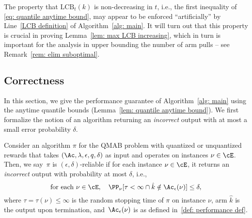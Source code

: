 \begin{remark}
\label{rem: LCB non decreasing}
    The property that $ \mathrm{LCB}_t(k)$ is non-decreasing 
    in $t$, i.e., the first inequality of \eqref{eq: quantile anytime bound}, may appear to be enforced ``artificially'' by Line~\ref{LCB definition} of Algorithm~\ref{alg: main}. 
    It will turn out that this property is crucial in proving Lemma~\ref{lem: max LCB increasing}, which 
    in turn is important for the analysis in upper bounding the number of arm pulls -- see Remark~\ref{rem: elim suboptimal}.
\end{remark}

\subsection{Correctness}
In this section, we give the performance guarantee of Algorithm~\ref{alg: main} using the anytime quantile bounds (Lemma~\ref{lem: quantile anytime bound}).
We first formalize the notion of an algorithm returning an \textit{incorrect} output with at most a small error probability $\delta$.

\begin{definition}
     Consider an algorithm $\pi$ for the QMAB problem with quantized or  unquantized rewards that takes $(\Ac, \lambda, \epsilon, q, \delta)$ as input and operates on instances $\nu \in \cE$. 
     Then, we say~$\pi$ is $(\epsilon, \delta)$-reliable if for each instance $\nu \in \cE$, it returns an \emph{incorrect} output with probability at most $\delta$, i.e.,     
    \begin{equation}
    \label{def: reliable}
        \text{for each } \nu \in \cE, \quad 
        \PP_{\nu}[ \tau < \infty \cap \hat{k} \notin \Ac_{\epsilon}(\nu) ] \le \delta,
    \end{equation}
    where $\tau = \tau(\nu) \le \infty$ is the random stopping time of $\pi$ on instance $\nu$,
    arm $\hat{k}$ is the output upon termination, and~$\Ac_{\epsilon}(\nu)$ is as defined in~\eqref{def: performance def}.
\end{definition}

